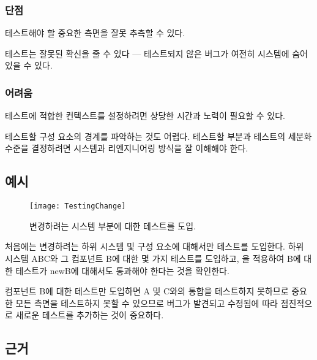 \documentclass[a4paper,10pt,twoside]{book}
\begin{document}
\subsubsection*{단점}

\begin{bulletlist}
\item 테스트해야 할 중요한 측면을 잘못 추측할 수 있다.
\item 테스트는 잘못된 확신을 줄 수 있다 --- 테스트되지 않은 버그가 여전히 시스템에 숨어 있을 수 있다.
\end{bulletlist}

\subsubsection*{어려움}

\begin{bulletlist}
\item 테스트에 적합한 컨텍스트를 설정하려면 상당한 시간과 노력이 필요할 수 있다.
\item 테스트할 구성 요소의 경계를 파악하는 것도 어렵다. 테스트할 부분과 테스트의 세분화 수준을 결정하려면 시스템과 리엔지니어링 방식을 잘 이해해야 한다.
\end{bulletlist}

\subsection*{예시}

\begin{figure}[h]
\begin{center}
\texttt{[image: TestingChange]}
\caption{변경하려는 시스템 부분에 대한 테스트를 도입.}
\end{center}
\end{figure}

처음에는 변경하려는 하위 시스템 및 구성 요소에 대해서만 테스트를 도입한다. 하위 시스템 ABC와 그 컴포넌트 B에 대한 몇 가지 테스트를 도입하고, 을 적용하여 B에 대한 테스트가 newB에 대해서도 통과해야 한다는 것을 확인한다.

컴포넌트 B에 대한 테스트만 도입하면 A 및 C와의 통합을 테스트하지 못하므로 중요한 모든 측면을 테스트하지 못할 수 있으므로 버그가 발견되고 수정됨에 따라 점진적으로 새로운 테스트를 추가하는 것이 중요하다.

\subsection*{근거}
\end{document}
